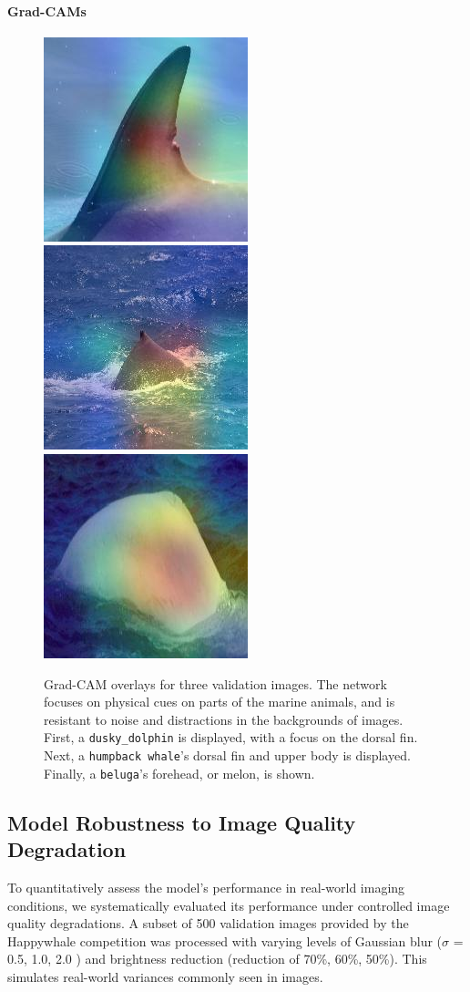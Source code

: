 \documentclass[twocolumn]{article}
\begin{document}
\paragraph{Grad-CAMs}
\begin{figure}[H]
  \includegraphics[width=0.32\linewidth]{gradcam_dusky_dolphin.jpg}
  \includegraphics[width=0.32\linewidth]{gradcam_humpback_whale.jpg}
  \includegraphics[width=0.32\linewidth]{gradcam_beluga.jpg}
  \caption{Grad-CAM overlays for three validation images.  The network focuses on physical cues on parts of the marine animals, and is resistant to noise and distractions in the backgrounds of images. First, a \texttt{dusky\_dolphin} is displayed, with a focus on the dorsal fin. Next, a \texttt{humpback whale}'s dorsal fin and upper body is displayed. Finally, a \texttt{beluga}'s forehead, or melon, is shown.}
  \label{fig:gradcam_examples}
\end{figure}

\subsection{Model Robustness to Image Quality Degradation}

To quantitatively assess the model's performance in real-world imaging conditions, we systematically evaluated its performance under controlled image quality degradations. A subset of 500 validation images provided by the Happywhale competition was processed with varying levels of Gaussian blur ($\sigma$ = 0.5, 1.0, 2.0 ) and brightness reduction (reduction of 70\%, 60\%, 50\%). This simulates real-world variances commonly seen in images.
\end{document}

